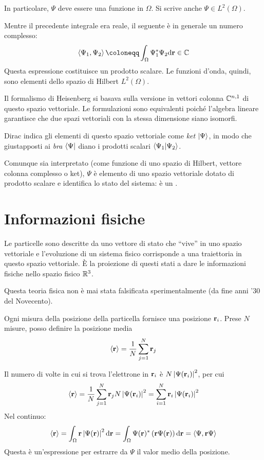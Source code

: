 In particolare, $\Psi$ deve essere una funzione  in $\Omega$.
Si scrive anche $\Psi \in L^2(\Omega)$.

Mentre il precedente integrale era reale, il seguente è in generale un numero complesso:
\begin{equation}
    \inner{\Psi_1}{\Psi_2} \coloneqq \int_\Omega \conj{\Psi_1} \Psi_2 \de\p \in \C
\end{equation}
Questa espressione costituisce un prodotto scalare.
Le funzioni d'onda, quindi, sono elementi dello spazio di Hilbert $L^2(\Omega)$.

Il formalismo di Heisenberg si basava sulla versione in vettori colonna $\mathbb{C}^{n,1}$ di questo spazio vettoriale.
Le formulazioni sono equivalenti poiché l'algebra lineare garantisce che due spazi vettoriali con la stessa dimensione siano isomorfi.

Dirac indica gli elementi di questo spazio vettoriale come \textit{ket} $\left\lvert \Psi \right\rangle$, in modo che giustapposti ai \textit{bra} $\left\langle \Psi \right\rvert$ diano i prodotti scalari $\braket{\Psi_1}{\Psi_2}$.

Comunque sia interpretato (come funzione di uno spazio di Hilbert, vettore colonna complesso o ket), $\Psi$ è elemento di uno spazio vettoriale dotato di prodotto scalare e identifica lo stato del sistema: è un .

\section{Informazioni fisiche}

Le particelle sono descritte da uno vettore di stato che ``vive'' in uno spazio vettoriale e l'evoluzione di un sistema fisico corrisponde a una traiettoria in questo spazio vettoriale.
È la proiezione di questi stati a dare le informazioni fisiche nello spazio fisico $\mathbb{R}^3$.

Questa teoria fisica non è mai stata falsificata sperimentalmente (da fine anni '30 del Novecento).

Ogni misura della posizione della particella fornisce una posizione $\mathbf{r}_i$.
Prese $N$ misure, posso definire la posizione media
\begin{equation}
    \left\langle \mathbf{r} \right\rangle = \frac{1}{N} \sum_{j = 1}^N \mathbf{r}_j
\end{equation}

Il numero di volte in cui si trova l'elettrone in $\mathbf{r}_i$ è $N \left\lvert \Psi(\mathbf{r}_i) \right\rvert^2$, per cui
\begin{equation}
    \left\langle \mathbf{r} \right\rangle = \frac{1}{N} \sum_{j = 1}^N \mathbf{r}_j N \left\lvert \Psi(\mathbf{r}_i) \right\rvert^2 = \sum_{i = 1}^N \mathbf{r}_i \left\lvert \Psi(\mathbf{r}_i) \right\rvert^2
\end{equation}
Nel continuo:
\begin{equation}
    \left\langle \mathbf{r} \right\rangle = \int_\Omega \mathbf{r} \left\lvert \Psi(\mathbf{r}) \right\rvert^2 \mathrm{d}\mathbf{r}
    = \int_\Omega \Psi(\mathbf{r})^* \left( \mathbf{r} \Psi(\mathbf{r}) \right) \mathrm{d}\mathbf{r}
    = \left\langle \Psi, \mathbf{r} \Psi \right\rangle
\end{equation}
Questa è un'espressione per estrarre da $\Psi$ il valor medio della posizione.

